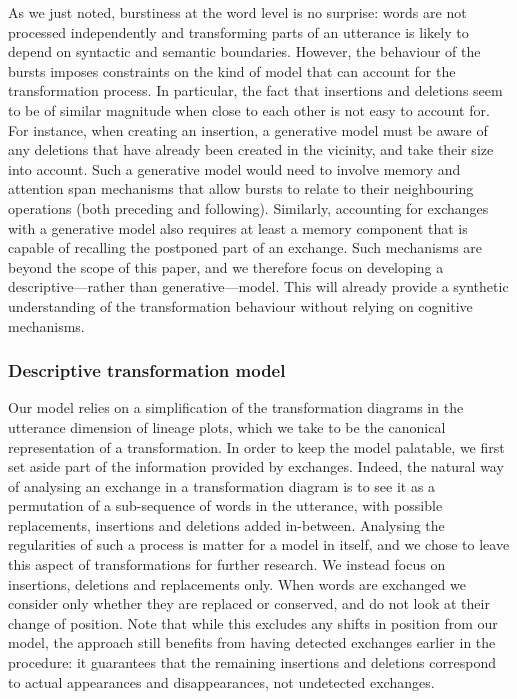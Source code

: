 As we just noted, burstiness at the word level is no surprise: words are
not processed independently and transforming parts of an utterance is
likely to depend on syntactic and semantic boundaries. However, the
behaviour of the bursts imposes constraints on the kind of model that
can account for the transformation process. In particular, the fact that
insertions and deletions seem to be of similar magnitude when close to
each other is not easy to account for. For instance, when creating an
insertion, a generative model must be aware of any deletions that have
already been created in the vicinity, and take their size into account.
Such a generative model would need to involve memory and attention span
mechanisms that allow bursts to relate to their neighbouring operations
(both preceding and following). Similarly, accounting for exchanges with
a generative model also requires at least a memory component that is
capable of recalling the postponed part of an exchange. Such mechanisms
are beyond the scope of this paper, and we therefore focus on
developing a descriptive---rather than generative---model. This will
already provide 
a synthetic understanding of the transformation
behaviour without relying on cognitive mechanisms. 

\subsubsection{Descriptive transformation
model}\label{descriptive-transformation-model}

Our model relies on a simplification of the transformation diagrams in
the utterance dimension of lineage plots, which we take to be the
canonical representation of a transformation. In order to keep the model
palatable, we first set aside part of the information provided by
exchanges. Indeed, the natural way of analysing an exchange in a
transformation diagram is to see it as a permutation of a sub-sequence
of words in the utterance, with possible replacements, insertions and
deletions added in-between. Analysing the regularities of such a process
is matter for a model in itself, and we chose to leave this aspect of
transformations for further research. We instead focus on insertions,
deletions and replacements only. When words are exchanged we consider
only whether they are replaced or conserved, and do not look at their
change of position. Note that while this excludes any shifts in position
from our model, the approach still benefits from having detected
exchanges earlier in the procedure: it guarantees that the remaining
insertions and deletions correspond to actual appearances and
disappearances, not undetected exchanges.

